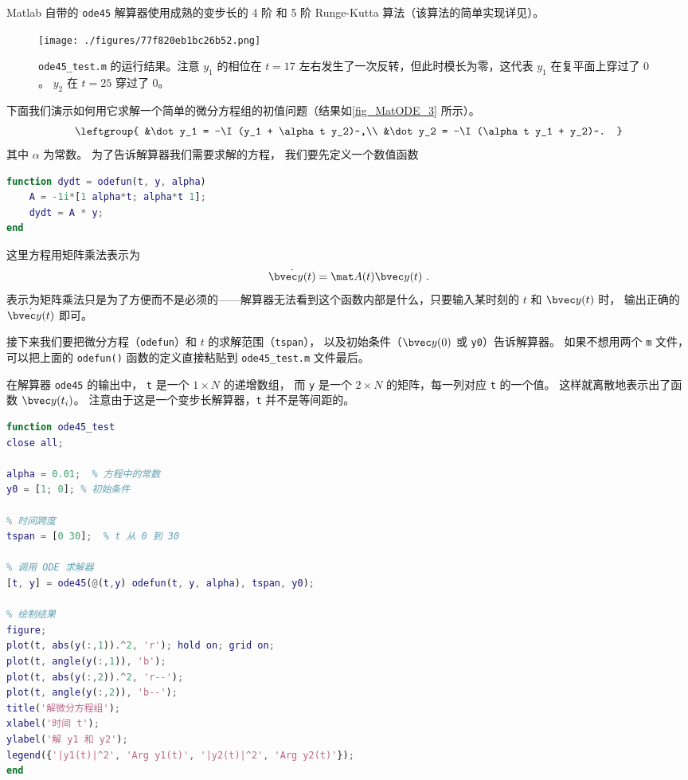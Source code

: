 

Matlab 自带的 \verb`ode45` 解算器使用成熟的变步长的 4 阶 和 5 阶 Runge-Kutta 算法（该算法的简单实现详见）。

\begin{figure}[ht]
\centering
\texttt{[image: ./figures/77f820eb1bc26b52.png]}
\caption{\verb|ode45_test.m| 的运行结果。注意 $y_1$ 的相位在 $t=17$ 左右发生了一次反转，但此时模长为零，这代表 $y_1$ 在复平面上穿过了 $0$。 $y_2$ 在 $t=25$ 穿过了 $0$。} \label{fig_MatODE_3}
\end{figure}

下面我们演示如何用它求解一个简单的微分方程组的初值问题（结果如\autoref{fig_MatODE_3} 所示）。
\begin{equation}
\leftgroup{
&\dot y_1 = -\I (y_1 + \alpha t y_2)~,\\
&\dot y_2 = -\I (\alpha t y_1 + y_2)~.
}\end{equation}
其中 $\alpha$ 为常数。 为了告诉解算器我们需要求解的方程， 我们要先定义一个数值函数
\begin{lstlisting}[language=matlab,caption=odefun.m]
function dydt = odefun(t, y, alpha)
    A = -1i*[1 alpha*t; alpha*t 1];
    dydt = A * y;
end
\end{lstlisting}
这里方程用矩阵乘法表示为
\begin{equation}
\dot{\bvec y(t)} = \mat A(t) \bvec y(t)~.
\end{equation}
表示为矩阵乘法只是为了方便而不是必须的——解算器无法看到这个函数内部是什么，只要输入某时刻的 $t$ 和 $\bvec y(t)$ 时， 输出正确的 $\dot{\bvec y(t)}$ 即可。

接下来我们要把微分方程（\verb`odefun`）和 $t$ 的求解范围（\verb`tspan`）， 以及初始条件（$\bvec y(0)$ 或 \verb`y0`）告诉解算器。 如果不想用两个 \verb`m` 文件， 可以把上面的 \verb`odefun()` 函数的定义直接粘贴到 \verb`ode45_test.m` 文件最后。

在解算器 \verb`ode45` 的输出中， \verb`t` 是一个 $1\times N$ 的递增数组， 而 \verb`y` 是一个 $2\times N$ 的矩阵，每一列对应 \verb`t` 的一个值。 这样就离散地表示出了函数 $\bvec y(t_i)$。 注意由于这是一个变步长解算器，\verb`t` 并不是等间距的。
\begin{lstlisting}[language=matlab,caption=ode45\_test.m]
function ode45_test
close all;

alpha = 0.01;  % 方程中的常数
y0 = [1; 0]; % 初始条件

% 时间跨度
tspan = [0 30];  % t 从 0 到 30

% 调用 ODE 求解器
[t, y] = ode45(@(t,y) odefun(t, y, alpha), tspan, y0);

% 绘制结果
figure;
plot(t, abs(y(:,1)).^2, 'r'); hold on; grid on;
plot(t, angle(y(:,1)), 'b');
plot(t, abs(y(:,2)).^2, 'r--');
plot(t, angle(y(:,2)), 'b--');
title('解微分方程组');
xlabel('时间 t');
ylabel('解 y1 和 y2');
legend({'|y1(t)|^2', 'Arg y1(t)', '|y2(t)|^2', 'Arg y2(t)'});
end
\end{lstlisting}
